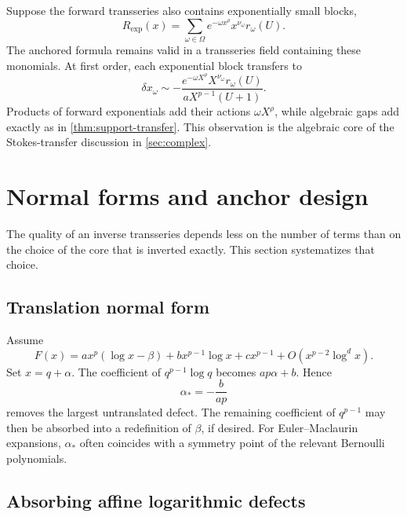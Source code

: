 \documentclass[11pt,oneside]{article}
\theoremstyle{plain}
\theoremstyle{definition}
\theoremstyle{remark}
\begin{document}
Suppose the forward transseries also contains exponentially small blocks,
\begin{equation}
 R_{\exp}(x)=
 \sum_{\omega\in\Omega}e^{-\omega x^\rho}
 x^{\nu_\omega}r_\omega(U).
 \label{eq:exp-forward}
\end{equation}
The anchored formula remains valid in a transseries field containing these
monomials.  At first order, each exponential block transfers to
\begin{equation}
 \delta x_\omega
 \sim-\frac{e^{-\omega X^\rho}X^{\nu_\omega}r_\omega(U)}
           {aX^{p-1}(U+1)}.
 \label{eq:exp-first-inverse}
\end{equation}
Products of forward exponentials add their actions
\(\omega X^\rho\), while algebraic gaps add exactly as in
\cref{thm:support-transfer}.  This observation is the algebraic core of the
Stokes-transfer discussion in \cref{sec:complex}.

\section{Normal forms and anchor design}
\label{sec:normal-forms}

The quality of an inverse transseries depends less on the number of terms than
on the choice of the core that is inverted exactly.  This section systematizes
that choice.

\subsection{Translation normal form}

Assume
\begin{equation}
 F(x)=a x^p(\log x-\beta)+b x^{p-1}\log x
 +c x^{p-1}+O(x^{p-2}\log^d x).
 \label{eq:translation-input}
\end{equation}
Set \(x=q+\alpha\).  The coefficient of \(q^{p-1}\log q\) becomes
\(ap\alpha+b\).  Hence
\begin{equation}
 \alpha_*=-\frac{b}{ap}
 \label{eq:optimal-translation}
\end{equation}
removes the largest untranslated defect.  The remaining coefficient of
\(q^{p-1}\) may then be absorbed into a redefinition of \(\beta\), if desired.
For Euler--Maclaurin expansions, \(\alpha_*\) often coincides with a symmetry
point of the relevant Bernoulli polynomials.

\subsection{Absorbing affine logarithmic defects}
\end{document}
